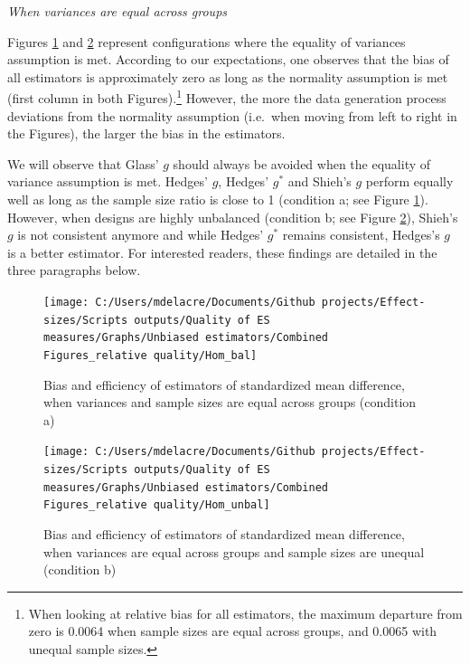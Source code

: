 \documentclass[
  english,
  man,floatsintext]{apa6}
\begin{document}
\emph{When variances are equal across groups}

Figures \ref{fig:idHombal} and \ref{fig:idHomunbal} represent configurations where the equality of variances assumption is met. According to our expectations, one observes that the bias of all estimators is approximately zero as long as the normality assumption is met (first column in both Figures).\footnote{When looking at relative bias for all estimators, the maximum departure from zero is 0.0064 when sample sizes are equal across groups, and 0.0065 with unequal sample sizes.} However, the more the data generation process deviations from the normality assumption (i.e.~when moving from left to right in the Figures), the larger the bias in the estimators.

We will observe that Glass' \(g\) should always be avoided when the equality of variance assumption is met. Hedges' \(g\), Hedges' \(g^*\) and Shieh's \(g\) perform equally well as long as the sample size ratio is close to 1 (condition a; see Figure \ref{fig:idHombal}). However, when designs are highly unbalanced (condition b; see Figure \ref{fig:idHomunbal}), Shieh's \(g\) is not consistent anymore and while Hedges' \(g^*\) remains consistent, Hedges's \(g\) is a better estimator. For interested readers, these findings are detailed in the three paragraphs below.

\begin{landscape}
\newpage

\begin{figure}

{\centering \texttt{[image: C:/Users/mdelacre/Documents/Github projects/Effect-sizes/Scripts outputs/Quality of ES measures/Graphs/Unbiased estimators/Combined Figures\_relative quality/Hom\_bal]} 

}

\caption{Bias and efficiency of estimators of standardized mean difference, when variances and sample sizes are equal across groups (condition a)}\label{fig:idHombal}
\end{figure}
\end{landscape}
\newpage
\begin{landscape}

\begin{figure}

{\centering \texttt{[image: C:/Users/mdelacre/Documents/Github projects/Effect-sizes/Scripts outputs/Quality of ES measures/Graphs/Unbiased estimators/Combined Figures\_relative quality/Hom\_unbal]} 

}

\caption{Bias and efficiency of estimators of standardized mean difference, when variances are equal across groups and sample sizes are unequal (condition b)}\label{fig:idHomunbal}
\end{figure}

\end{landscape}
\end{document}
